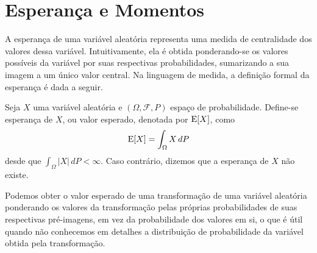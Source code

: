 \section{Esperança e Momentos}

A esperança de uma variável aleatória representa uma medida de centralidade dos valores
dessa variável.
Intuitivamente, ela é obtida ponderando-se os valores possíveis da variável por suas
respectivas probabilidades, sumarizando a sua imagem a um único valor central.
Na linguagem de medida, a definição formal da esperança é dada a seguir.

\begin{def:esperanca}
Seja $X$ uma variável aleatória e $(\Omega, \mathcal{F}, P)$ espaço de probabilidade.
Define-se esperança de $X$, ou valor esperado, denotada por $\mathrm{E}\!\left[X\right]$, como
\[
	\mathrm{E}\!\left[X\right] = \int_\Omega X\, dP
\]
desde que $\int_\Omega |X|\, dP < \infty$.
Caso contrário, dizemos que a esperança de $X$ não existe.
\end{def:esperanca}

Podemos obter o valor esperado de uma transformação de uma variável aleatória ponderando
os valores da transformação pelas próprias probabilidades de suas respectivas pré-imagens,
em vez da probabilidade dos valores em si, o que é útil quando não conhecemos em detalhes
a distribuição de probabilidade da variável obtida pela transformação.

